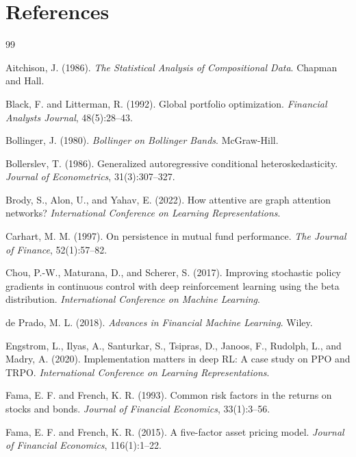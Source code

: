 \documentclass[10pt]{article}
\begin{document}
\section{References}

\begin{thebibliography}{99}

	Aitchison, J. (1986).
	\newblock \emph{The Statistical Analysis of Compositional Data}.
	\newblock Chapman and Hall.

	Black, F. and Litterman, R. (1992).
	\newblock Global portfolio optimization.
	\newblock \emph{Financial Analysts Journal}, 48(5):28--43.

	Bollinger, J. (1980).
	\newblock \emph{Bollinger on Bollinger Bands}.
	\newblock McGraw-Hill.

	Bollerslev, T. (1986).
	\newblock Generalized autoregressive conditional heteroskedasticity.
	\newblock \emph{Journal of Econometrics}, 31(3):307--327.

	Brody, S., Alon, U., and Yahav, E. (2022).
	\newblock How attentive are graph attention networks?
	\newblock \emph{International Conference on Learning Representations}.

	Carhart, M. M. (1997).
	\newblock On persistence in mutual fund performance.
	\newblock \emph{The Journal of Finance}, 52(1):57--82.

	Chou, P.-W., Maturana, D., and Scherer, S. (2017).
	\newblock Improving stochastic policy gradients in continuous control with deep reinforcement
	learning using the beta distribution.
	\newblock \emph{International Conference on Machine Learning}.

	de Prado, M. L. (2018).
	\newblock \emph{Advances in Financial Machine Learning}.
	\newblock Wiley.

	Engstrom, L., Ilyas, A., Santurkar, S., Tsipras, D., Janoos, F., Rudolph, L., and Madry, A. (2020).
	\newblock Implementation matters in deep RL: A case study on PPO and TRPO.
	\newblock \emph{International Conference on Learning Representations}.

	Fama, E. F. and French, K. R. (1993).
	\newblock Common risk factors in the returns on stocks and bonds.
	\newblock \emph{Journal of Financial Economics}, 33(1):3--56.

	Fama, E. F. and French, K. R. (2015).
	\newblock A five-factor asset pricing model.
	\newblock \emph{Journal of Financial Economics}, 116(1):1--22.


\end{thebibliography}
\end{document}
